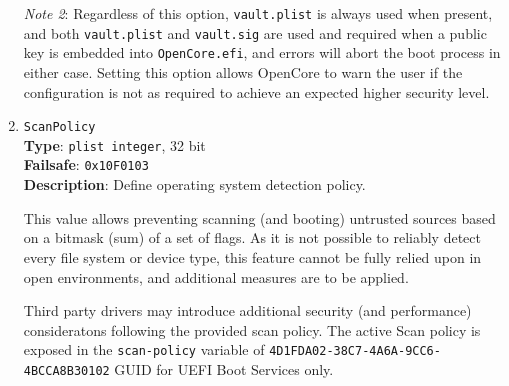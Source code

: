\documentclass[]{article}
\begin{document}
\begin{enumerate}
  \emph{Note 2}:  Regardless of this option, \texttt{vault.plist} is always used when
  present, and both \texttt{vault.plist} and \texttt{vault.sig} are used and required
  when a public key is embedded into \texttt{OpenCore.efi}, and errors will abort the
  boot process in either case. Setting this option allows OpenCore to warn the user if
  the configuration is not as required to achieve an expected higher security level.

\item
  \texttt{ScanPolicy}\\
  \textbf{Type}: \texttt{plist\ integer}, 32 bit\\
  \textbf{Failsafe}: \texttt{0x10F0103}\\
  \textbf{Description}: Define operating system detection policy.

  This value allows preventing scanning (and booting) untrusted
  sources based on a bitmask (sum) of a set of flags. As it is not possible
  to reliably detect every file system or device type, this feature
  cannot be fully relied upon in open environments, and additional
  measures are to be applied.

  Third party drivers may introduce additional security (and performance)
  consideratons following the provided scan policy. The active Scan policy is exposed
  in the \texttt{scan-policy} variable of \texttt{4D1FDA02-38C7-4A6A-9CC6-4BCCA8B30102}
  GUID for UEFI Boot Services only.


\end{enumerate}
\end{document}
